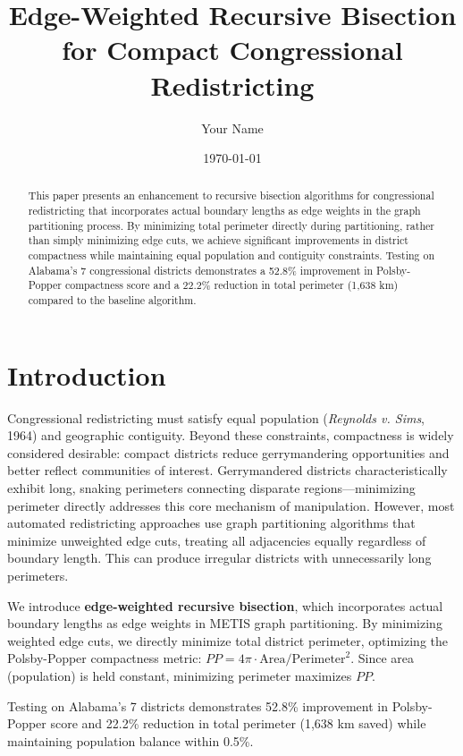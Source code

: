 \documentclass[11pt,twocolumn]{article}
\title{Edge-Weighted Recursive Bisection for Compact Congressional Redistricting}
\author{Your Name}
\date{\today}
\begin{document}
\maketitle

\begin{abstract}
This paper presents an enhancement to recursive bisection algorithms for congressional redistricting that incorporates actual boundary lengths as edge weights in the graph partitioning process. By minimizing total perimeter directly during partitioning, rather than simply minimizing edge cuts, we achieve significant improvements in district compactness while maintaining equal population and contiguity constraints. Testing on Alabama's 7 congressional districts demonstrates a 52.8\% improvement in Polsby-Popper compactness score and a 22.2\% reduction in total perimeter (1,638 km) compared to the baseline algorithm.
\end{abstract}

\section{Introduction}

Congressional redistricting must satisfy equal population (\textit{Reynolds v. Sims}, 1964) and geographic contiguity. Beyond these constraints, compactness is widely considered desirable: compact districts reduce gerrymandering opportunities and better reflect communities of interest. Gerrymandered districts characteristically exhibit long, snaking perimeters connecting disparate regions---minimizing perimeter directly addresses this core mechanism of manipulation. However, most automated redistricting approaches use graph partitioning algorithms that minimize unweighted edge cuts, treating all adjacencies equally regardless of boundary length. This can produce irregular districts with unnecessarily long perimeters.

We introduce \textbf{edge-weighted recursive bisection}, which incorporates actual boundary lengths as edge weights in METIS graph partitioning. By minimizing weighted edge cuts, we directly minimize total district perimeter, optimizing the Polsby-Popper compactness metric: $PP = 4\pi \cdot \text{Area}/\text{Perimeter}^2$. Since area (population) is held constant, minimizing perimeter maximizes $PP$.

Testing on Alabama's 7 districts demonstrates 52.8\% improvement in Polsby-Popper score and 22.2\% reduction in total perimeter (1,638 km saved) while maintaining population balance within 0.5\%.
\end{document}
